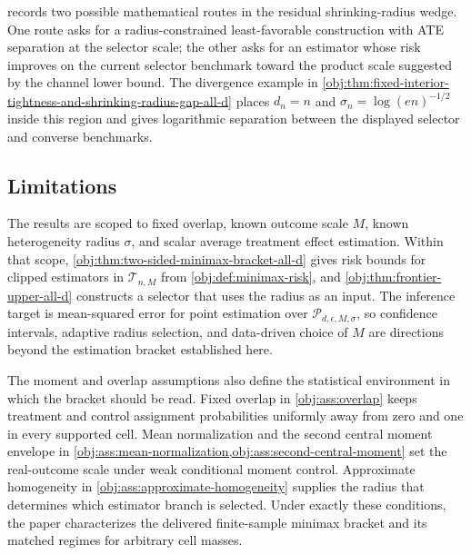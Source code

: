  records two possible mathematical routes in the residual shrinking-radius wedge. One route asks for a radius-constrained least-favorable construction with ATE separation at the selector scale; the other asks for an estimator whose risk improves on the current selector benchmark toward the product scale suggested by the channel lower bound. The divergence example in \cref{obj:thm:fixed-interior-tightness-and-shrinking-radius-gap-all-d} places \(d_n=n\) and \(\sigma_n=\log(en)^{-1/2}\) inside this region and gives logarithmic separation between the displayed selector and converse benchmarks.

\subsection{Limitations}

The results are scoped to fixed overlap, known outcome scale \(M\), known heterogeneity radius \(\sigma\), and scalar average treatment effect estimation. Within that scope, \cref{obj:thm:two-sided-minimax-bracket-all-d} gives risk bounds for clipped estimators in \(\mathcal T_{n,M}\) from \cref{obj:def:minimax-risk}, and \cref{obj:thm:frontier-upper-all-d} constructs a selector that uses the radius as an input. The inference target is mean-squared error for point estimation over \(\mathcal P_{d,\epsilon,M,\sigma}\), so confidence intervals, adaptive radius selection, and data-driven choice of \(M\) are directions beyond the estimation bracket established here.

The moment and overlap assumptions also define the statistical environment in which the bracket should be read. Fixed overlap in \cref{obj:ass:overlap} keeps treatment and control assignment probabilities uniformly away from zero and one in every supported cell. Mean normalization and the second central moment envelope in \cref{obj:ass:mean-normalization,obj:ass:second-central-moment} set the real-outcome scale under weak conditional moment control. Approximate homogeneity in \cref{obj:ass:approximate-homogeneity} supplies the radius that determines which estimator branch is selected. Under exactly these conditions, the paper characterizes the delivered finite-sample minimax bracket and its matched regimes for arbitrary cell masses.
